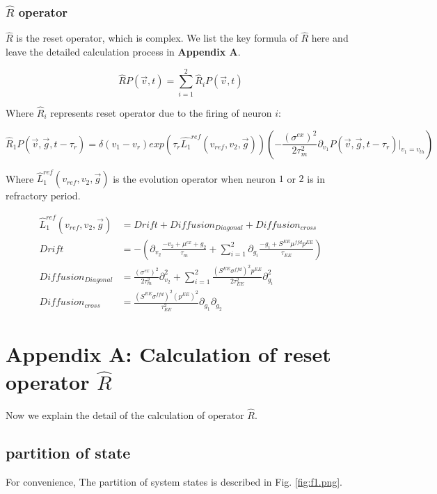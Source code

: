 \documentclass{article}
\begin{document}
\subsubsection{$\hat{R}$ operator}
$\hat{R}$ is the reset operator, which is complex. We list the key formula of $\hat{R}$ here and leave the detailed calculation process in \textbf{Appendix A}.

\begin{equation}
	\hat{R}P(\vec{v},t)=\sum_{i=1}^{2}\hat{R}_iP(\vec{v},t)
\end{equation}

Where $\hat{R}_i$ represents reset operator due to the firing of neuron $i$:

\begin{equation}
	\hat{R}_1P(\vec{v},\vec{g},t-\tau_r)=\delta(v_1-v_r)exp(\tau_r\hat{L_1}^{ref}(v_{ref},v_2,\vec{g}))(-\frac{(\sigma^{ex})^2}{2\tau_m^2}\partial_{v_1}P(\vec{v},\vec{g},t-\tau_r)|_{v_1=v_{th}})
\end{equation}

Where $\hat{L}_1^{ref}(v_{ref},v_2,\vec{g})$ is the evolution operator when neuron $1$ or $2$ is in refractory period.

\begin{align}
    \hat{L}_1^{ref}(v_{ref},v_2,\vec{g})&=Drift + Diffusion_{Diagonal}+Diffusion_{cross}\\
	Drift&=-(\partial_{v_2}\frac{-v_2+\mu^{ex}+g_2}{\tau_m}+\sum_{i=1}^{2}\partial_{g_i}\frac{-g_i+S^{EE}\mu^{ffd}p^{EE}}{\tau_{EE}})\\
	Diffusion_{Diagonal}&=\frac{(\sigma^{ex})^2}{2\tau_m^2}\partial_{v_2}^2+\sum_{i=1}^{2}\frac{(S^{EE}\sigma^{ffd})^2p^{EE}}{2\tau_{EE}^2}\partial_{g_i}^2\\
	Diffusion_{cross}&=\frac{(S^{EE}\sigma^{ffd})^2(p^{EE})^2}{\tau_{EE}^2}\partial_{g_1}\partial_{g_2}
\end{align}

	\section{Appendix A: Calculation of reset operator $\hat{R}$}
	
	Now we explain the detail of the calculation of operator $\hat{R}$.
		
	\subsection{partition of state}
	
	For convenience, The partition of system states is described in Fig. \eqref{fig:f1.png}.
	
\end{document}
